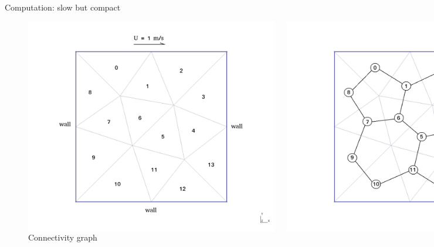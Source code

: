 \documentclass[xcolor=dvipsnames]{beamer}
\begin{document}
\begin{frame}{Computation: slow but compact}
\begin{figure}
  \centering
  \begin{columns}
    \centering
    \caption {Geometry and mesh}
    \includegraphics[width=0.99\textwidth]{cavity_2d_tet_i}
    \centering
    \caption {Connectivity graph}
    \includegraphics[width=0.99\textwidth]{cavity_2d_tet_d}
  \end{columns}
\end{figure}
\end{frame}
\end{document}
